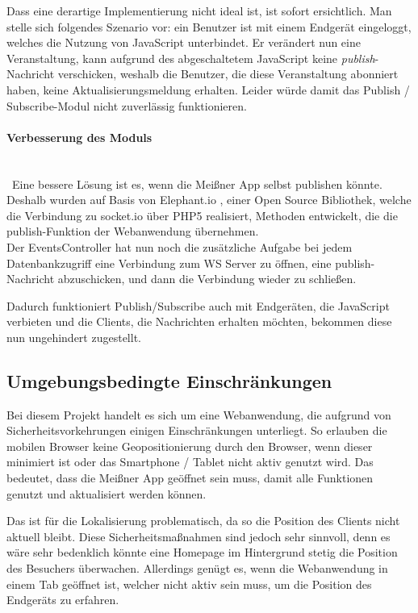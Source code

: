 Dass eine derartige Implementierung nicht ideal ist, ist sofort ersichtlich. Man stelle sich folgendes Szenario vor: ein Benutzer ist mit einem Endgerät eingeloggt, welches die Nutzung von JavaScript unterbindet. Er verändert nun eine Veranstaltung, kann aufgrund des abgeschaltetem JavaScript keine \emph{publish}-Nachricht verschicken, weshalb die Benutzer, die diese Veranstaltung abonniert haben, keine Aktualisierungsmeldung erhalten. Leider würde damit das Publish / Subscribe-Modul nicht zuverlässig funktionieren.

\paragraph{Verbesserung des Moduls}\ \\ \
Eine bessere Lösung ist es, wenn die Meißner App selbst publishen könnte. Deshalb wurden auf Basis von Elephant.io \cite{elephant.io}, einer Open Source Bibliothek, welche die Verbindung zu socket.io über PHP5 realisiert, Methoden entwickelt, die die publish-Funktion der Webanwendung übernehmen.\\
Der EventsController hat nun noch die zusätzliche Aufgabe bei jedem Datenbankzugriff eine Verbindung zum WS Server zu öffnen, eine publish-Nachricht abzuschicken, und dann die Verbindung wieder zu schließen.\par

Dadurch funktioniert Publish/Subscribe auch mit Endgeräten, die JavaScript verbieten und die Clients, die Nachrichten erhalten möchten, bekommen diese nun ungehindert zugestellt.

\subsection{Umgebungsbedingte Einschränkungen}
Bei diesem Projekt handelt es sich um eine Webanwendung, die aufgrund von Sicherheitsvorkehrungen einigen Einschränkungen unterliegt. So erlauben die mobilen Browser keine Geopositionierung durch den Browser, wenn dieser minimiert ist oder das Smartphone / Tablet nicht aktiv genutzt wird. Das bedeutet, dass die Meißner App geöffnet sein muss, damit alle Funktionen genutzt und aktualisiert werden können.\par

Das ist für die Lokalisierung problematisch, da so die Position des Clients nicht aktuell bleibt. Diese Sicherheitsmaßnahmen sind jedoch sehr sinnvoll, denn es wäre sehr bedenklich könnte eine Homepage im Hintergrund stetig die Position des Besuchers überwachen. Allerdings genügt es, wenn die Webanwendung in einem Tab geöffnet ist, welcher nicht aktiv sein muss, um die Position des Endgeräts zu erfahren.



